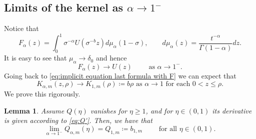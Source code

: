 \documentclass[a4paper]{article}
\newtheorem{lemma}[theorem]{Lemma}
\theoremstyle{definition}
\begin{document}
\subsection{Limits of the kernel as $\alpha \to 1^-$}
Notice that
\begin{equation*}
  F_\alpha (z) = \int_0^1 \sigma^{-\alpha} U(\sigma^{-b} z) d \mu_\alpha(1-\sigma), \qquad d\mu_\alpha (z) = \frac{t^{-\alpha}}{\Gamma(1-\alpha)} dz.
\end{equation*}
It is easy to see that $\mu_\alpha \to \delta_0$ and hence
\begin{equation*}
  F_\alpha (z) \to U(z) \qquad \text{ as } \alpha \to 1^-.
\end{equation*}
Going back to \eqref{eq:implicit equation last formula with F} we can expect that
\begin{equation}
  \label{eq:K limit as alpha to 1}
  K_{\alpha,m}(z,\rho) \to K_{1,m} (\rho) \coloneqq b \rho \text{ as } \alpha \to 1 \text{ for each } 0 < z \le \rho.
\end{equation}
We prove this rigorously.
\begin{lemma}
  \label{eq:Q limit alpha -> 1}
  Assume $Q(\eta)$ vanishes for $\eta \ge 1$, and for $\eta \in (0,1)$ its derivative is given according to \eqref{eq:Q'}.
  Then, we have that
  \[
    \lim_{\alpha \to 1^-} Q_{\alpha,m}(\eta) = Q_{1,m} \coloneqq b_{1,m}  \qquad \text{ for all } \eta \in (0,1).
  \]
\end{lemma}
\end{document}
